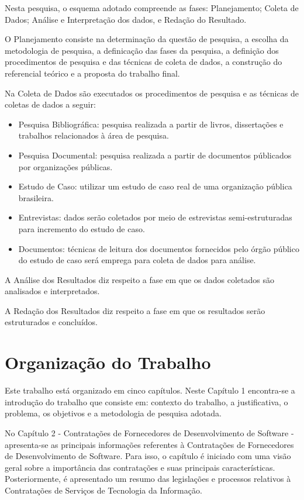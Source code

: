 Nesta pesquisa, o esquema adotado compreende as fases: Planejamento; Coleta
de Dados; Análise e Interpretação dos dados, e Redação do Resultado. 

O Planejamento consiste na determinação da questão de pesquisa, a escolha da metodologia de pesquisa, a definicação das fases da pesquisa,  a definição dos procedimentos de pesquisa e das técnicas de coleta de dados, a construção do referencial teórico e a proposta do trabalho final.


Na Coleta de Dados são executados os procedimentos de pesquisa e as técnicas de coletas de dados a seguir:

\begin{itemize}
\item Pesquisa Bibliográfica: pesquisa realizada a partir de livros, dissertações e trabalhos relacionados à área de pesquisa.
\item Pesquisa Documental: pesquisa realizada a partir de documentos públicados por organizações públicas.
\item Estudo de Caso: utilizar um estudo de caso real de uma organização pública brasileira.
\item Entrevistas: dados serão coletados por meio de estrevistas semi-estruturadas para incremento do estudo de caso.
\item Documentos: técnicas de leitura dos documentos fornecidos pelo órgão público do estudo de caso será emprega para coleta de dados para análise.
\end{itemize}

A Análise dos Resultados diz respeito a fase em que os dados coletados são analisados e interpretados.

A Redação dos Resultados diz respeito a fase em que os resultados serão estruturados e concluídos.

\section[Organização do Trabalho]{Organização do Trabalho}

Este trabalho está organizado em cinco capítulos. Neste Capítulo 1 encontra-se a introdução do trabalho que consiste em: contexto do trabalho, a justificativa,  o problema, os objetivos e a metodologia de pesquisa adotada.

No Capítulo 2 - Contratações de Fornecedores de Desenvolvimento de Software - apresenta-se as principais informações referentes à Contratações de Fornecedores de Desenvolvimento de Software. Para isso, o capítulo é iniciado com uma visão geral sobre a importância das contratações e suas principais características. Posteriormente, é apresentado um resumo das legislações e processos relativos à Contratações de Serviços de Tecnologia da Informação.

